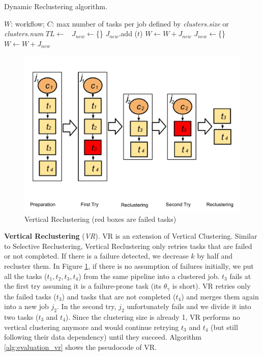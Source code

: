\documentclass{IOS-Book-Article}
\begin{document}
\begin{algorithm}[!htb]
	\footnotesize
	\caption{Dynamic Reclustering algorithm.}
	\label{alg:evaluation_dr}
	\begin{algorithmic}[1]
		\Require $W$: workflow; $C$: max number of tasks per job defined by \emph{clusters.size} or \emph{clusters.num}
			\State $TL \gets$\ 
			\State $J_{new}\gets$\{\}
					\State $J_{new}$.add ($t$)
				\EndIf
					\State $W \gets W + J_{new}$
					\State $J_{new}\gets$\{\}
				\EndIf
			\EndFor
			\State $W \gets W + J_{new}$ 
		\EndProcedure
	\end{algorithmic}
\end{algorithm}

\begin{figure}[!htb]
\centering
  \includegraphics[width=0.75\linewidth]{vr.pdf}
  \caption{Vertical Reclustering (red boxes are failed tasks)}
  \label{fig:clustering_vr}
\end{figure}

\textbf{Vertical Reclustering} (\emph{VR}). VR is an extension of Vertical Clustering. Similar to Selective Reclustering, Vertical Reclustering only retries tasks that are failed or not completed.
If there is a failure detected, we decrease $k$ by half and recluster them. In Figure \ref{fig:clustering_vr}, if there is no assumption of failures initially, we put all the tasks ($t_1, t_2, t_3, t_4$) from the same  pipeline into a clustered job. $t_3$ fails at the first try assuming it is a failure-prone task (its $\theta_{\gamma}$ is short). VR retries only the failed tasks ($t_3$) and tasks that are not completed ($t_4$) and merges them again into a new job $j_2$. In the second try, $j_2$ unfortunately fails and we divide it into two tasks ($t_3$ and $t_4$). Since the clustering size is already 1, VR performs no vertical clustering anymore and would continue retrying $t_3$ and $t_4$ (but still following their data dependency) until they succeed. Algorithm \ref{alg:evaluation_vr} shows the pseudocode of VR. 
\end{document}
